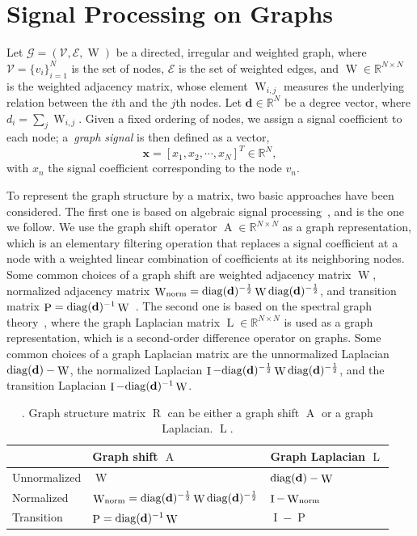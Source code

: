 \documentclass[journal,twocolumn,10pt]{IEEEtran}
\theoremstyle{definition}
\newcommand{\R}{\ensuremath{\mathbb{R}}}
\DeclareMathOperator{\Id}{I}
\def\x{\mathbf{x}}
\def\d{\mathbf{d}}
\def\V{\mathcal{V}}
\def\E{\mathcal{E}}
\DeclareMathOperator{\LL}{L}
\DeclareMathOperator{\Adj}{A}
\DeclareMathOperator{\Pj}{P}
\DeclareMathOperator{\RR}{R}
\DeclareMathOperator{\W}{W}
\begin{document}
\section{Signal Processing on Graphs}
\label{sec:spg}
Let $\mathcal{G} = (\V,\E, \W)$  be a directed, irregular and weighted graph, where $\V = \{v_i \}_{i=1}^N$ is the set of nodes, $\E$ is the set of weighted edges, and $\W \in \R^{N \times N}$ is the weighted adjacency matrix, whose element $\W_{i,j}$ measures the underlying relation between the $i$th and the $j$th nodes. Let $\d \in \R^N$ be a degree vector, where $d_i = \sum_j \W_{i,j}$. Given a fixed ordering of nodes, we assign a signal coefficient to each node; a~\emph{graph signal} is then defined as a vector,
$$
	\x = [x_1,x_2,\cdots,x_N]^T \in \R^N,
$$
with $x_n$ the signal coefficient corresponding to the node $v_n$. 

To represent the graph structure by a matrix, two basic approaches have been considered. The first one is based on algebraic signal processing~\cite{PueschelM:08}, and is the one we follow. We use the graph shift operator $\Adj \in \R^{N \times N}$ as a graph representation, which is an elementary filtering operation that replaces a signal coefficient at a node with a weighted linear combination of coefficients at its neighboring nodes. Some common choices of a graph shift are weighted adjacency matrix $\W$, normalized adjacency matrix $\W_{\rm norm} = {\rm diag}(\d)^{-\frac{1}{2}} \W {\rm diag}(\d)^{-\frac{1}{2}}$, and transition matrix $\Pj = {\rm diag}(\d)^{-1} \W$~\cite{ChenSMK:13}.  The second one is based on the spectral graph theory~\cite{Chung:96}, where the graph Laplacian matrix $\LL \in \R^{N \times N}$ is used  as a graph representation, which is a second-order difference operator on graphs. Some common choices of a graph Laplacian matrix are the unnormalized Laplacian  ${\rm diag}(\d) - \W$, the normalized Laplacian  $\Id - {\rm diag}(\d)^{-\frac{1}{2}} \W {\rm diag}(\d)^{-\frac{1}{2}}$, and the transition Laplacian $\Id - {\rm diag}(\d)^{-1} \W $. 

\begin{table}[htbp]
  \footnotesize
  \begin{center}
    \begin{tabular}{@{}lll@{}}
      \toprule
     & Graph shift  $\Adj$ &  Graph Laplacian $\LL$ \\
      \midrule \addlinespace[1mm]
 Unnormalized &   $\W$ & ${\rm diag}(\d) - \W$ \\

Normalized & $\W_{\rm norm} = {\rm diag}(\d)^{-\frac{1}{2}} \W {\rm diag}(\d)^{-\frac{1}{2}}$ & $\Id - \W_{\rm norm}$ \\

Transition  & $\Pj = {\rm diag}(\d)^{-1} \W$  & $\Id - \Pj$ \\

\bottomrule
\end{tabular} 
\caption{\label{tab:graph_structure_matrix}. Graph structure matrix $\RR$ can be either a graph shift $\Adj $ or a graph Laplacian. $\LL$. }
\end{center}
\end{table}
\end{document}

